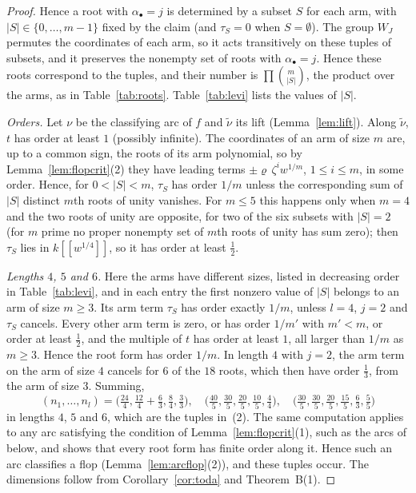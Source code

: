 \documentclass[11pt]{amsart}
\numberwithin{table}{section}
\numberwithin{figure}{section}
\numberwithin{equation}{section}
\theoremstyle{definition}
\theoremstyle{plain}
\newcommand{\bul}{\bullet}
\newcommand{\tnu}{\tilde\nu}
\begin{document}
\begin{proof}
Hence a root with $\alpha_\bul = j$ is determined by a subset $S$ for each arm, with $|S| \in \{0, \dots, m - 1\}$ fixed by the claim (and $\tau_S = 0$ when $S = \emptyset$). The group $W_J$ permutes the coordinates of each arm, so it acts transitively on these tuples of subsets, and it preserves the nonempty set of roots with $\alpha_\bul = j$. Hence these roots correspond to the tuples, and their number is $\prod\binom{m}{|S|}$, the product over the arms, as in Table~\ref{tab:roots}. Table~\ref{tab:levi} lists the values of $|S|$.

\emph{Orders.} Let $\nu$ be the classifying arc of $f$ and $\tnu$ its lift (Lemma~\ref{lem:lift}). Along $\tnu$, $t$ has order at least $1$ (possibly infinite). The coordinates of an arm of size $m$ are, up to a common sign, the roots of its arm polynomial, so by Lemma~\ref{lem:flopcrit}(2) they have leading terms $\pm\varrho\,\zeta^i w^{1/m}$, $1 \le i \le m$, in some order. Hence, for $0 < |S| < m$, $\tau_S$ has order $1/m$ unless the corresponding sum of $|S|$ distinct $m$th roots of unity vanishes. For $m \le 5$ this happens only when $m = 4$ and the two roots of unity are opposite, for two of the six subsets with $|S| = 2$ (for $m$ prime no proper nonempty set of $m$th roots of unity has sum zero); then $\tau_S$ lies in $k[[w^{1/4}]]$, so it has order at least $\frac12$.

\emph{Lengths $4$, $5$ and $6$.} Here the arms have different sizes, listed in decreasing order in Table~\ref{tab:levi}, and in each entry the first nonzero value of $|S|$ belongs to an arm of size $m \ge 3$. Its arm term $\tau_S$ has order exactly $1/m$, unless $l = 4$, $j = 2$ and $\tau_S$ cancels. Every other arm term is zero, or has order $1/m'$ with $m' < m$, or order at least $\frac12$, and the multiple of $t$ has order at least $1$, all larger than $1/m$ as $m \ge 3$. Hence the root form has order $1/m$. In length $4$ with $j = 2$, the arm term on the arm of size $4$ cancels for $6$ of the $18$ roots, which then have order $\frac13$, from the arm of size $3$. Summing,
\[
(n_1, \dots, n_l) = \bigl(\tfrac{24}{4}, \tfrac{12}{4} + \tfrac63, \tfrac84, \tfrac33\bigr), \quad \bigl(\tfrac{40}{5}, \tfrac{30}{5}, \tfrac{20}{5}, \tfrac{10}{5}, \tfrac44\bigr), \quad \bigl(\tfrac{30}{5}, \tfrac{30}{5}, \tfrac{20}{5}, \tfrac{15}{5}, \tfrac63, \tfrac55\bigr)
\]
in lengths $4$, $5$ and $6$, which are the tuples in~(2). The same computation applies to any arc satisfying the condition of Lemma~\ref{lem:flopcrit}(1), such as the arcs of \cite[Examples~5.4, 5.5]{K} below, and shows that every root form has finite order along it. Hence such an arc classifies a flop (Lemma~\ref{lem:arcflop}(2)), and these tuples occur. The dimensions follow from Corollary~\ref{cor:toda} and Theorem~B(1).


\end{proof}
\end{document}
